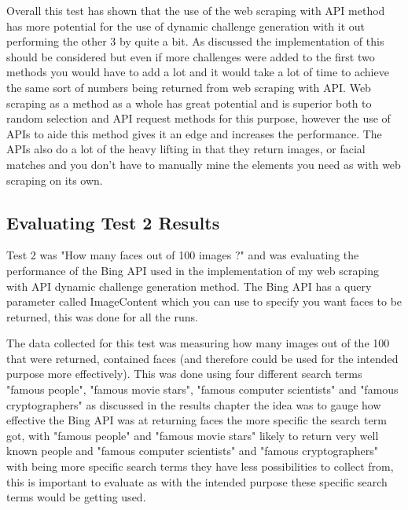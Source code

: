 \documentclass[12pt,a4paper]{article}
\begin{document}
Overall this test has shown that the use of the web scraping with API method has more potential for the use of dynamic challenge generation with it out performing the other 3 by quite a bit. As discussed the implementation of this should be considered but even if more challenges were added to the first two methods you would have to add a lot and it would take a lot of time to achieve the same sort of numbers being returned from web scraping with API. Web scraping as a method as a whole has great potential and is superior both to random selection and API request methods for this purpose, however the use of APIs to aide this method gives it an edge and increases the performance. The APIs also do a lot of the heavy lifting in that they return images, or facial matches and you don't have to manually mine the elements you need as with web scraping on its own. 

\subsection{Evaluating Test 2 Results}  
Test 2 was "How many faces out of 100 images ?" and was evaluating the performance of the Bing API used in the implementation of my web scraping with API dynamic challenge generation method. The Bing API has a query parameter called ImageContent which you can use to specify you want faces to be returned, this was done for all the runs.

The data collected for this test was measuring how many images out of the 100 that were returned, contained faces (and therefore could be used for the intended purpose more effectively). This was done using four different search terms "famous people", "famous movie stars", "famous computer scientists" and "famous cryptographers" as discussed in the results chapter the idea was to gauge how effective the Bing API was at returning faces the more specific the search term got, with "famous people" and "famous movie stars" likely to return very well known people and "famous computer scientists" and "famous cryptographers" with being more specific search terms they have less possibilities to collect from, this is important to evaluate as with the intended purpose these specific search terms would be getting used.  
\end{document}

